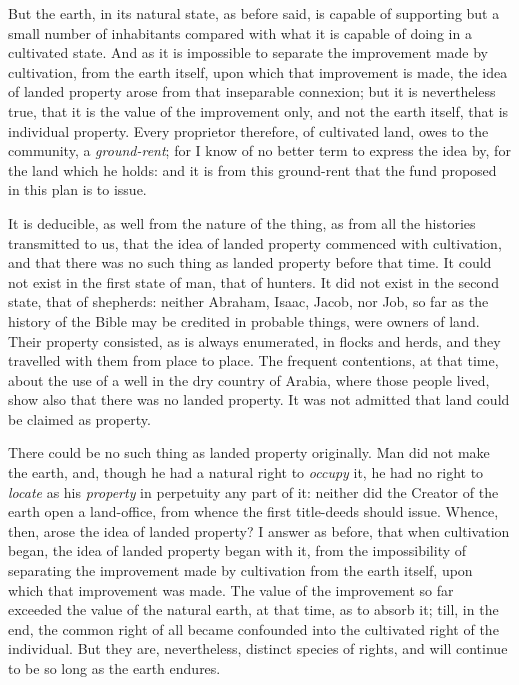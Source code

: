 But the earth, in its natural state, as before said, is capable of supporting but a small number of inhabitants compared with what it is capable of doing in a cultivated state. And as it is impossible to separate the improvement made by cultivation, from the earth itself, upon which that improvement is made, the idea of landed property arose from that inseparable connexion; but it is nevertheless true, that it is the value of the improvement only, and not the earth itself, that is individual property. Every proprietor therefore, of cultivated land, owes to the community, a \emph{ground-rent}; for I know of no better term to express the idea by, for the land which he holds: and it is from this ground-rent that the fund proposed in this plan is to issue.

It is deducible, as well from the nature of the thing, as from all the histories transmitted to us, that the idea of landed property commenced with cultivation, and that there was no such thing as landed property before that time. It could not exist in the first state of man, that of hunters. It did not exist in the second state, that of shepherds: neither Abraham, Isaac, Jacob, nor Job, so far as the history of the Bible may be credited in probable things, were owners of land. Their property consisted, as is always enumerated, in flocks and herds, and they travelled with them from place to place. The frequent contentions, at that time, about the use of a well in the dry country of Arabia, where those people lived, show also that there was no landed property. It was not admitted that land could be claimed as property.

There could be no such thing as landed property originally. Man did not make the earth, and, though he had a natural right to \emph{occupy} it, he had no right to \emph{locate} as his \emph{property} in perpetuity any part of it: neither did the Creator of the earth open a land-office, from whence the first title-deeds should issue. Whence, then, arose the idea of landed property? I answer as before, that when cultivation began, the idea of landed property began with it, from the impossibility of separating the improvement made by cultivation from the earth itself, upon which that improvement was made. The value of the improvement so far exceeded the value of the natural earth, at that time, as to absorb it; till, in the end, the common right of all became confounded into the cultivated right of the individual. But they are, nevertheless, distinct species of rights, and will continue to be so long as the earth endures.

